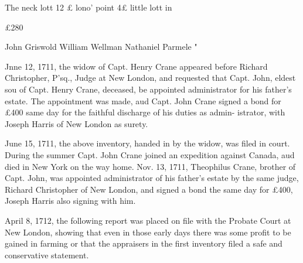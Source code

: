 \documentclass[oneside]{book}
\begin{document}
The neck lott 12 £ lono' point 4£ little lott in 








£280   

John Griswold 
William Wellman 
Nathaniel Parmele " 



Jnne 12, 1711, the widow of Capt. Henry Crane appeared 
before Richard Christopher, P'sq., Judge at New London, and 
requested that Capt. John, eldest sou of Capt. Henry Crane, 
deceased, be appointed administrator for his father's estate. The 
appointment was made, aud Capt. John Crane signed a bond for 
£400 same day for the faithful discharge of his duties as admin- 
istrator, with Joseph Harris of New London as surety. 

June 15, 1711, the above inventory, handed in by the widow, 
was filed in court. During the summer Capt. John Crane joined 
an expedition against Canada, aud died in New York on the way 
home. Nov. 13, 1711, Theophilus Crane, brother of Capt. John, 
was appointed administrator of his father's estate by the same 
judge, Richard Christopher of New London, and signed a bond 
the same day for £400, Joseph Harris also signing with him. 

April 8, 1712, the following report was placed on file with the 
Probate Court at New London, showing that even in those early 
days there was some profit to be gained in farming or that the 
appraisers in the first inventory filed a safe and conservative 
statement. 
\end{document}
